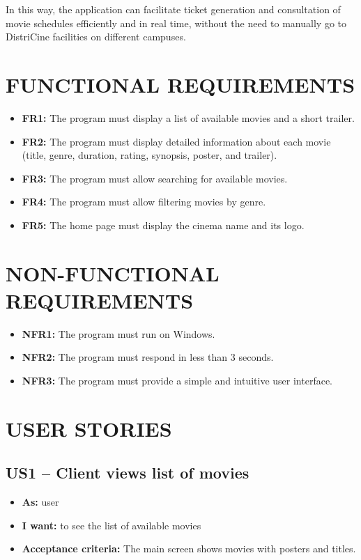 \documentclass[12pt, letterpaper]{article}
\begin{document}
In this way, the application can facilitate ticket generation and consultation of movie schedules efficiently and in real time, without the need to manually go to DistriCine facilities on different campuses.

\section{FUNCTIONAL REQUIREMENTS}
\begin{itemize}
    \item \textbf{FR1:} The program must display a list of available movies and a short trailer.
    \item \textbf{FR2:} The program must display detailed information about each movie (title, genre, duration, rating, synopsis, poster, and trailer).
    \item \textbf{FR3:} The program must allow searching for available movies.
    \item \textbf{FR4:} The program must allow filtering movies by genre.
    \item \textbf{FR5:} The home page must display the cinema name and its logo.
\end{itemize}

\section{NON-FUNCTIONAL REQUIREMENTS}
\begin{itemize}
    \item \textbf{NFR1:} The program must run on Windows.
    \item \textbf{NFR2:} The program must respond in less than 3 seconds.
    \item \textbf{NFR3:} The program must provide a simple and intuitive user interface.
\end{itemize}

\section{USER STORIES}

\subsection*{US1 – Client views list of movies}
\begin{itemize}
    \item \textbf{As:} user
    \item \textbf{I want:} to see the list of available movies
    \item \textbf{Acceptance criteria:} The main screen shows movies with posters and titles.
\end{itemize}
\end{document}
